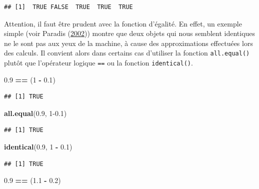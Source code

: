 \documentclass[
  11pt,
]{book}
\newenvironment{Shaded}{\begin{snugshade}}{\end{snugshade}}
\newcommand{\DecValTok}[1]{\textcolor[rgb]{0.00,0.00,0.81}{#1}}
\newcommand{\FloatTok}[1]{\textcolor[rgb]{0.00,0.00,0.81}{#1}}
\newcommand{\KeywordTok}[1]{\textcolor[rgb]{0.13,0.29,0.53}{\textbf{#1}}}
\newcommand{\NormalTok}[1]{#1}
\newcommand{\OperatorTok}[1]{\textcolor[rgb]{0.81,0.36,0.00}{\textbf{#1}}}
\newcommand{\StringTok}[1]{\textcolor[rgb]{0.31,0.60,0.02}{#1}}
\numberwithin{equation}{section}
\numberwithin{countremarque}{section}
\begin{document}
\begin{lstlisting}
## [1]  TRUE FALSE  TRUE  TRUE  TRUE
\end{lstlisting}

Attention, il faut être prudent avec la fonction d'égalité. En effet, un exemple simple (voir Paradis (\protect\hyperlink{ref-Paradis_2002_R}{2002})) montre que deux objets qui nous semblent identiques ne le sont pas aux yeux de la machine, à cause des approximations effectuées lors des calculs. Il convient alors dans certains cas d'utiliser la fonction \texttt{all.equal()} plutôt que l'opérateur logique \texttt{==} ou la fonction \texttt{identical()}.

\begin{Shaded}
\begin{Highlighting}[]
\FloatTok{0.9} \OperatorTok{==}\StringTok{ }\NormalTok{(}\DecValTok{1} \OperatorTok{{-}}\StringTok{ }\FloatTok{0.1}\NormalTok{)}
\end{Highlighting}
\end{Shaded}

\begin{lstlisting}
## [1] TRUE
\end{lstlisting}

\begin{Shaded}
\begin{Highlighting}[]
\KeywordTok{all.equal}\NormalTok{(}\FloatTok{0.9}\NormalTok{, }\DecValTok{1}\FloatTok{{-}0.1}\NormalTok{)}
\end{Highlighting}
\end{Shaded}

\begin{lstlisting}
## [1] TRUE
\end{lstlisting}

\begin{Shaded}
\begin{Highlighting}[]
\KeywordTok{identical}\NormalTok{(}\FloatTok{0.9}\NormalTok{, }\DecValTok{1} \OperatorTok{{-}}\StringTok{ }\FloatTok{0.1}\NormalTok{)}
\end{Highlighting}
\end{Shaded}

\begin{lstlisting}
## [1] TRUE
\end{lstlisting}

\begin{Shaded}
\begin{Highlighting}[]
\FloatTok{0.9} \OperatorTok{==}\StringTok{ }\NormalTok{(}\FloatTok{1.1} \OperatorTok{{-}}\StringTok{ }\FloatTok{0.2}\NormalTok{)}
\end{Highlighting}
\end{Shaded}
\end{document}
